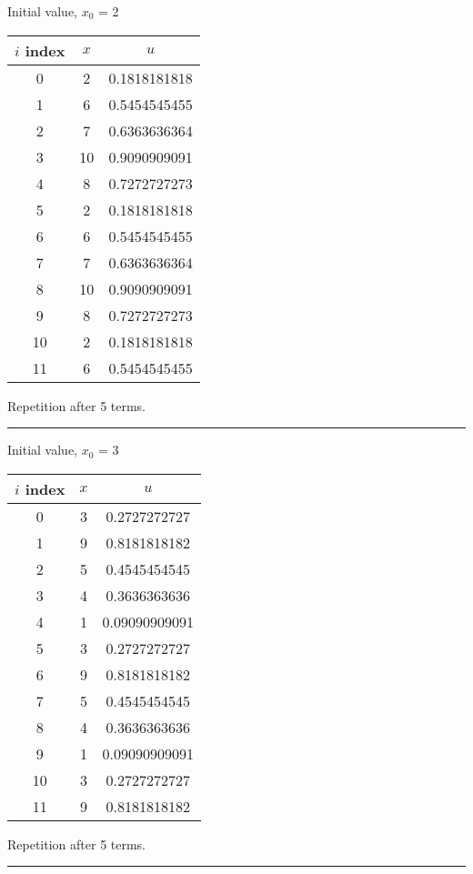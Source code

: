 \documentclass{article}
\begin{document}
Initial value, $x_0$ = 2
\begin{center} \begin{tabular}{||c | c | c||}  \hline
		$i$ index & $x$ & $u$ \\ [0.5ex] \hline \hline0 & 2 & 0.1818181818\\
		\hline 
		1 & 6 & 0.5454545455\\
		\hline 
		2 & 7 & 0.6363636364\\
		\hline 
		3 & 10 & 0.9090909091\\
		\hline 
		4 & 8 & 0.7272727273\\
		\hline 
		5 & 2 & 0.1818181818\\
		\hline 
		6 & 6 & 0.5454545455\\
		\hline 
		7 & 7 & 0.6363636364\\
		\hline 
		8 & 10 & 0.9090909091\\
		\hline 
		9 & 8 & 0.7272727273\\
		\hline 
		10 & 2 & 0.1818181818\\
		\hline 
		11 & 6 & 0.5454545455\\
		\hline 
	\end{tabular} 
\end{center} Repetition after 5 terms.
\\ \noindent\rule[0.5ex]{\linewidth}{1pt}
Initial value, $x_0$ = 3
\begin{center} \begin{tabular}{||c | c | c||}  \hline
		$i$ index & $x$ & $u$ \\ [0.5ex] \hline \hline0 & 3 & 0.2727272727\\
		\hline 
		1 & 9 & 0.8181818182\\
		\hline 
		2 & 5 & 0.4545454545\\
		\hline 
		3 & 4 & 0.3636363636\\
		\hline 
		4 & 1 & 0.09090909091\\
		\hline 
		5 & 3 & 0.2727272727\\
		\hline 
		6 & 9 & 0.8181818182\\
		\hline 
		7 & 5 & 0.4545454545\\
		\hline 
		8 & 4 & 0.3636363636\\
		\hline 
		9 & 1 & 0.09090909091\\
		\hline 
		10 & 3 & 0.2727272727\\
		\hline 
		11 & 9 & 0.8181818182\\
		\hline 
	\end{tabular} 
\end{center} Repetition after 5 terms.
\\ \noindent\rule[0.5ex]{\linewidth}{1pt}
\pagebreak
\end{document}
